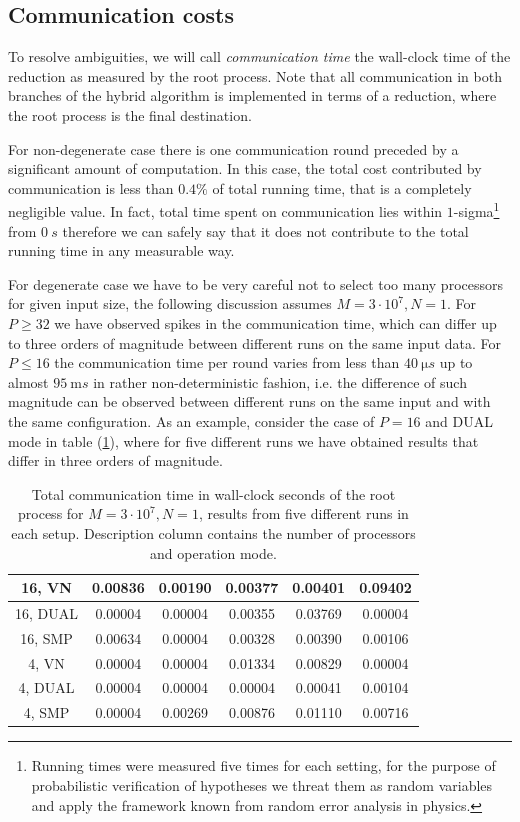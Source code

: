\subsection*{Communication costs}

To resolve ambiguities, we will call \emph{communication time} the wall-clock time of the reduction as measured by the root process.
Note that all communication in both branches of the hybrid algorithm is implemented in terms of a reduction, where the root process is the final destination.

For non-degenerate case there is one communication round preceded by a significant amount of computation.
In this case, the total cost contributed by communication is less than $0.4 \%$ of total running time, that is a completely negligible value.
In fact, total time spent on communication lies within $1$-sigma\footnote{Running times were measured five times for each setting, for the purpose of probabilistic verification of hypotheses we threat them as random variables and apply the framework known from random error analysis in physics.} from $\SI{0}{s}$ therefore we can safely say that it does not contribute to the total running time in any measurable way.

For degenerate case we have to be very careful not to select too many processors for given input size, the following discussion assumes $M = 3 \cdot 10^{7}, N = 1$.
For $P \geq 32$ we have observed spikes in the communication time, which can differ up to three orders of magnitude between different runs on the same input data.
For $P \leq 16$ the communication time per round varies from less than $\SI{40}{\micro s}$ up to almost $\SI{95}{\milli s}$ in rather non-deterministic fashion, i.e. the difference of such magnitude can be observed between different runs on the same input and with the same configuration.
As an example, consider the case of $P = 16$ and DUAL mode in table (\ref{table:communication-cost}), where for five different runs we have obtained results that differ in three orders of magnitude.

\begin{table}[h]
\centering
\begin{tabular}{c|c|c|c|c|c|}
16, VN   & 0.00836 & 0.00190 & 0.00377 & 0.00401 & 0.09402 \\
\hline
16, DUAL & 0.00004 & 0.00004 & 0.00355 & 0.03769 & 0.00004 \\
\hline
16, SMP  & 0.00634 & 0.00004 & 0.00328 & 0.00390 & 0.00106 \\
\hline
4,  VN   & 0.00004 & 0.00004 & 0.01334 & 0.00829 & 0.00004 \\
\hline
4,  DUAL & 0.00004 & 0.00004 & 0.00004 & 0.00041 & 0.00104 \\
\hline
4,  SMP  & 0.00004 & 0.00269 & 0.00876 & 0.01110 & 0.00716 \\
\hline
\end{tabular}
\caption{Total communication time in wall-clock seconds of the root process for $M = 3 \cdot 10^{7}, N = 1$, results from five different runs in each setup. Description column contains the number of processors and operation mode. \label{table:communication-cost}}
\end{table}

